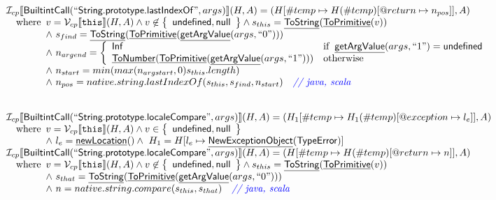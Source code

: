 \documentclass{article}
\makeatletter
\newcommand{\SF}[1]{\mbox{\textsf{#1}}}
\newcommand{\TT}[1]{\mbox{\texttt{#1}}}
\newcommand{\comment}[1]{\textit{#1}}
\newcommand{\wherec}[1]{{\rm where}\begin{array}[t]{l}#1\end{array}}
\newcommand{\ifc}[1]{{\rm if}\begin{array}[t]{l}#1\end{array}}
\newcommand{\owc}{{\rm otherwise}}
\newcommand{\I}{\mathcal{I}}
\newcommand{\V}{\mathcal{V}}
\newcommand{\set}[1]{\left\{\begin{array}{l}#1\end{array}\right\}}
\newcommand{\lbr}{\llbracket}
\newcommand{\rbr}{\rrbracket}
\newcommand{\hf}[1]{\underline{\sf #1}}
\newcommand{\varloc}[1]{\##1}
\newcommand{\varprop}[1]{@#1}
\def\inblue{\color{blue}}
\def\inblue{\color{blue}}
\makeatother
\begin{document}
\[\begin{array}{l}
\I _{cp}\lbr \SF{BuiltintCall}(``\SF{String.prototype.lastIndexOf}",args)\rbr(H,A)
 = (H[\varloc{temp}\mapsto H(\varloc{temp})[\varprop{return}\mapsto n_{pos}]], A) \\
\quad\wherec{
  v = \V _{cp}\lbr \TT{this}\rbr (H,A) \land v \not\in \set{\SF{undefined}, \SF{null}}
  \land s_{this} = \hf{ToString}(\hf{ToPrimitive}(v))\\
  \land\ s_{find} = \hf{ToString}(\hf{ToPrimitive}(\hf{getArgValue}(args, ``0")))\\
  \land\ n_{argend} = \left\{\begin{array}{ll}
      \SF{Inf} & \ifc{\hf{getArgValue}(args, ``1") = \SF{undefined}}\\
      \hf{ToNumber}(\hf{ToPrimitive}(\hf{getArgValue}(args, ``1"))) & \owc\\
    \end{array}\right.\\
  \land\ n_{start} = min(max(n_{argstart}, 0) s_{this}.length)\\
  \land\ n_{pos} = native.string.lastIndexOf(s_{this}, s_{find}, n_{start}) \quad\comment{{\inblue // java, scala}}\\
  }\\
\\\\
  
  
  
\I _{cp}\lbr \SF{BuiltintCall}(``\SF{String.prototype.localeCompare}",args)\rbr(H,A)
 = (H_1[\varloc{temp}\mapsto H_1(\varloc{temp})[\varprop{exception}\mapsto l_e]], A) \\
\quad\wherec{
  v = \V _{cp}\lbr \TT{this}\rbr (H,A) \land v \in \set{\SF{undefined}, \SF{null}}\\
  \land\ l_e = \hf{newLocation}() \land\ H_1=H[l_e\mapsto\hf{NewExceptionObject}(\SF{TypeError})] 
  }\\
  
\I _{cp}\lbr \SF{BuiltintCall}(``\SF{String.prototype.localeCompare}",args)\rbr(H,A)
 = (H[\varloc{temp}\mapsto H(\varloc{temp})[\varprop{return}\mapsto n]], A) \\
\quad\wherec{
  v = \V _{cp}\lbr \TT{this}\rbr (H,A) \land v \not\in \set{\SF{undefined}, \SF{null}}
  \land s_{this} = \hf{ToString}(\hf{ToPrimitive}(v))\\
  \land\ s_{that} = \hf{ToString}(\hf{ToPrimitive}(\hf{getArgValue}(args, ``0")))\\
  \land\ n = native.string.compare(s_{this}, s_{that})\quad\comment{{\inblue // java, scala}}\\
  }\\
\\\\



\end{array}\]
\end{document}
